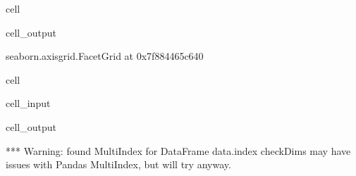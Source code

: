 \documentclass[letterpaper,table,10pt,english]{jupyterBook}
\begin{document}
\begin{sphinxuseclass}{cell}
\begin{sphinxVerbatimOutput}
\begin{sphinxuseclass}{cell_output}
\begin{sphinxVerbatim}[commandchars=\\\{\}]
\PYGZlt{}seaborn.axisgrid.FacetGrid at 0x7f884465c640\PYGZgt{}
\end{sphinxVerbatim}

\noindent{}

\end{sphinxuseclass}\end{sphinxVerbatimOutput}

\end{sphinxuseclass}
\begin{sphinxuseclass}{cell}\begin{sphinxVerbatimInput}

\begin{sphinxuseclass}{cell_input}
\begin{sphinxVerbatim}[commandchars=\\\{\}]
   
       
                      
\end{sphinxVerbatim}

\end{sphinxuseclass}\end{sphinxVerbatimInput}
\begin{sphinxVerbatimOutput}

\begin{sphinxuseclass}{cell_output}
\begin{sphinxVerbatim}[commandchars=\\\{\}]
*** Warning: found MultiIndex for DataFrame data.index \PYGZhy{} checkDims may have issues with Pandas MultiIndex, but will try anyway.
\end{sphinxVerbatim}


\end{sphinxuseclass}
\end{sphinxVerbatimOutput}
\end{sphinxuseclass}
\end{document}
